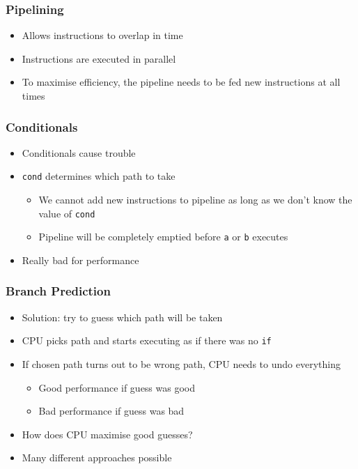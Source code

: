 \begin{frame}
  \frametitle{Pipelining}
  \begin{itemize}
    \item Allows instructions to overlap in time
    \item Instructions are executed in parallel
    \item To maximise efficiency, the pipeline needs to be fed new instructions at all times
  \end{itemize}
\end{frame}

\begin{frame}
  \frametitle{Conditionals}
  \begin{itemize}
    \item Conditionals cause trouble
    \item \texttt{cond} determines which path to take
          \begin{itemize}
            \item We cannot add new instructions to pipeline as long as we don't know the value of \texttt{cond}
            \item Pipeline will be completely emptied before \texttt{a} or \texttt{b} executes
          \end{itemize}
    \item Really bad for performance
  \end{itemize}
\end{frame}

\begin{frame}
  \frametitle{Branch Prediction}
  \begin{itemize}
    \item Solution: try to guess which path will be taken
    \item CPU picks path and starts executing as if there was no \texttt{if}
    \item If chosen path turns out to be wrong path, CPU needs to undo everything
          \begin{itemize}
            \item Good performance if guess was good
            \item Bad performance if guess was bad
          \end{itemize}
    \item How does CPU maximise good guesses?
    \item Many different approaches possible
  \end{itemize}
\end{frame}

